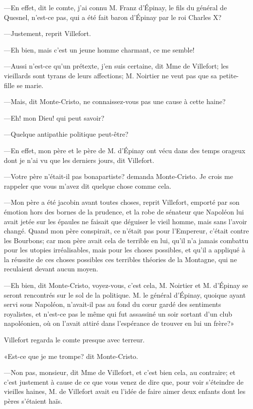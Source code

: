 —En effet, dit le comte, j'ai connu M. Franz d'Épinay, le fils du général de Quesnel, n'est-ce pas, qui a été fait baron d'Épinay par le roi Charles X? 

—Justement, reprit Villefort. 

—Eh bien, mais c'est un jeune homme charmant, ce me semble! 

—Aussi n'est-ce qu'un prétexte, j'en suis certaine, dit Mme de Villefort; les vieillards sont tyrans de leurs affections; M. Noirtier ne veut pas que sa petite-fille se marie. 

—Mais, dit Monte-Cristo, ne connaissez-vous pas une cause à cette haine? 

—Eh! mon Dieu! qui peut savoir? 

—Quelque antipathie politique peut-être? 

—En effet, mon père et le père de M. d'Épinay ont vécu dans des temps orageux dont je n'ai vu que les derniers jours, dit Villefort. 

—Votre père n'était-il pas bonapartiste? demanda Monte-Cristo. Je crois me rappeler que vous m'avez dit quelque chose comme cela. 

—Mon père a été jacobin avant toutes choses, reprit Villefort, emporté par son émotion hors des bornes de la prudence, et la robe de sénateur que Napoléon lui avait jetée sur les épaules ne faisait que déguiser le vieil homme, mais sans l'avoir changé. Quand mon père conspirait, ce n'était pas pour l'Empereur, c'était contre les Bourbons; car mon père avait cela de terrible en lui, qu'il n'a jamais combattu pour les utopies irréalisables, mais pour les choses possibles, et qu'il a appliqué à la réussite de ces choses possibles ces terribles théories de la Montagne, qui ne reculaient devant aucun moyen. 

—Eh bien, dit Monte-Cristo, voyez-vous, c'est cela, M. Noirtier et M. d'Épinay se seront rencontrés sur le sol de la politique. M. le général d'Épinay, quoique ayant servi sous Napoléon, n'avait-il pas au fond du cœur gardé des sentiments royalistes, et n'est-ce pas le même qui fut assassiné un soir sortant d'un club napoléonien, où on l'avait attiré dans l'espérance de trouver en lui un frère?» 

Villefort regarda le comte presque avec terreur. 

«Est-ce que je me trompe? dit Monte-Cristo.  

—Non pas, monsieur, dit Mme de Villefort, et c'est bien cela, au contraire; et c'est justement à cause de ce que vous venez de dire que, pour voir s'éteindre de vieilles haines, M. de Villefort avait eu l'idée de faire aimer deux enfants dont les pères s'étaient haïs. 


